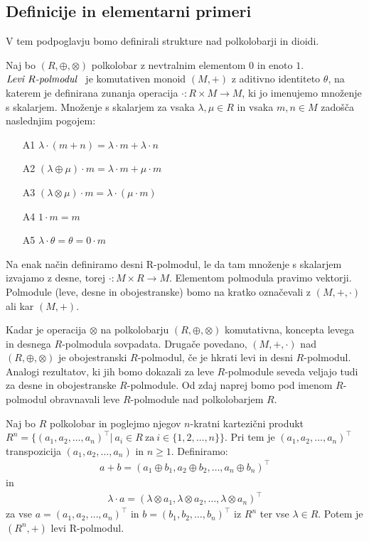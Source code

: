 \documentclass[mat1]{fmfdelo}
\newcommand{\pojem}[1]{\ensuremath{\emph{#1}}}
\newcommand{\map}[3]{\ensuremath{{#1}:{#2}\rightarrow{#3}}}
\begin{document}
\subsection{Definicije in elementarni primeri} \label{subsect:semimoduledef}
V tem podpoglavju bomo definirali stru\-kture nad polkolobarji in dioidi.

\begin{definicija}\label{def:polmodul}
	Naj bo $(R, \oplus, \otimes)$ polkolobar z nevtralnim elementom $0$ in enoto $1$.\pojem{Levi $R$-polmodul}~ je komutativen monoid $(M, +)$ z aditivno identiteto $\theta$, na katerem je definirana zunanja operacija \map{\cdot}{R\times M}{M}, ki jo imenujemo množenje s skalarjem. Množenje s skalarjem za vsaka $\lambda,\mu\in R$ in vsaka $m, n\in M$ zadošča naslednjim pogojem:
	\begin{enumerate}
		\item[A1] $\lambda\cdot(m + n) = \lambda\cdot m + \lambda\cdot n$
		\item[A2] $(\lambda \oplus \mu)\cdot m = \lambda\cdot m + \mu\cdot m$
		\item[A3]  $(\lambda\otimes\mu) \cdot m = \lambda \cdot (\mu \cdot m)$
		\item[A4] $1\cdot m = m$
		\item[A5] $\lambda\cdot\theta = \theta = 0\cdot m$
	\end{enumerate}

Na enak način definiramo desni R-polmodul, le da tam množenje s skalarjem izvajamo z desne, torej \map{\cdot}{M\times R}{M}. Elementom polmodula pravimo vektorji. Polmodule (leve, desne in obojestranske) bomo na kratko označevali z $(M, +, \cdot)$ ali kar $(M, +)$.
\end{definicija}

	 Kadar je operacija $\otimes$ na polkolobarju $(R,\oplus, \otimes)$ komutativna, koncepta levega in desnega $R$-polmodula sovpadata. Drugače povedano, $(M, +, \cdot)$ nad $(R, \oplus, \otimes)$ je obojestranski $R$-polmodul, če je hkrati levi in desni $R$-polmodul. Analogi rezultatov, ki jih bomo dokazali za leve $R$-polmodule seveda veljajo  tudi za desne in obojestranske $R$-polmodule. Od zdaj naprej bomo pod imenom $R$-polmodul obravnavali leve $R$-polmodule nad polkolobarjem $R$.

\begin{zgled}
	\label{zgled:Rnpolmodul}
	Naj bo $R$ polkolobar in poglejmo njegov $n$-kratni kartezični produkt $R^n = \{(a_1, a_2, \ldots, a_n)^{\top} |~ a_i \in R~\text{za}~i\in \{1, 2, \ldots, n\}\}$. Pri tem je $(a_1, a_2, \ldots, a_n)^{\top}$ transpozicija $(a_1, a_2, \ldots, a_n)$ in $n\geq 1$. Definiramo:
	\begin{align*}
		a + b = (a_1 \oplus b_1, a_2 \oplus b_2, \ldots, a_n \oplus b_n)^{\top}
	\end{align*}
	in
	\begin{align*}
		\lambda\cdot a = (\lambda\otimes a_1,\lambda\otimes a_2, \ldots,\lambda\otimes a_n)^{\top}
	\end{align*}
	za vse $a = (a_1, a_2, \ldots, a_n)^{\top}$ in $b = (b_1, b_2, \ldots, b_n)^{\top}$ iz $R^n$ ter vse $\lambda \in R$. Potem je $(R^n, +)$ levi R-polmodul.
\end{zgled}
\end{document}
